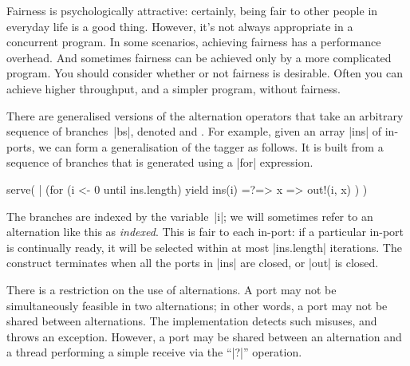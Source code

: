 Fairness is psychologically attractive: certainly, being fair to other people
in everyday life is a good thing.  However, it's not always appropriate in a
concurrent program.  In some scenarios, achieving fairness has a performance
overhead.  And sometimes fairness can be achieved only by a more complicated
program.  You should consider whether or not fairness is desirable.  Often you
can achieve higher throughput, and a simpler program, without fairness.


There are generalised versions of the alternation operators that take an
arbitrary sequence of branches~|bs|, denoted  and
.  For example, given an array |ins| of in-ports, we can
form a generalisation of the tagger as follows.  It is built from a sequence
of branches that is generated using a |for| expression.
% 
\begin{scala}
  serve( | (for (i <- 0 until ins.length) yield ins(i) =?=> { x => out!(i, x) }) )
\end{scala}
%
The branches are indexed by the variable~|i|; we will sometimes refer to an
alternation like this as \emph{indexed}.  This is fair to each in-port: if a
particular in-port is continually ready, it will be selected within at most
|ins.length| iterations.  The construct terminates when all the ports in |ins|
are closed, or |out| is closed.


There is a restriction on the use of alternations.  A port may not be
simultaneously feasible in two alternations; in other words, a port may not be
shared between alternations.  The implementation detects such misuses, and
throws an exception.  However, a port may be shared between an alternation and
a thread performing a simple receive via the ``|?|'' operation.
